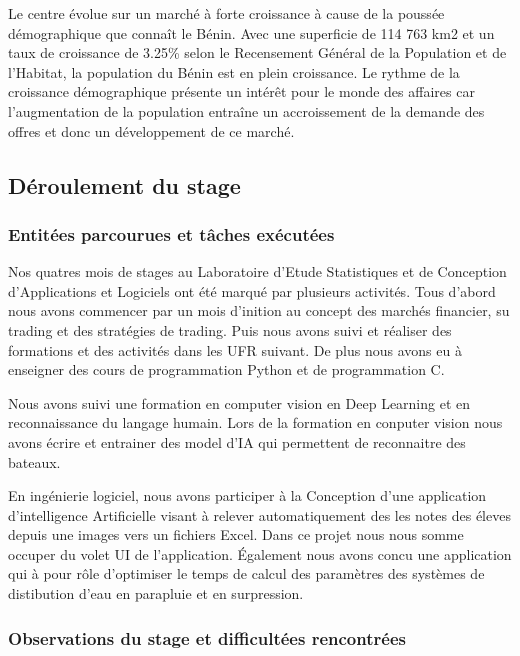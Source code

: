 Le centre évolue sur un marché à forte croissance à cause de la poussée
démographique que connaît le Bénin. Avec une superficie de 114 763 km2
et un taux de croissance de 3.25\% selon le Recensement Général de la
Population et de l'Habitat, la population du Bénin est en plein
croissance. Le rythme de la croissance démographique présente un intérêt
pour le monde des affaires car l'augmentation de la population entraîne
un accroissement de la demande des offres et donc un développement de ce
marché.

\subsection{Déroulement du stage}\label{duxe9roulement-du-stage}

\subsubsection{Entitées parcourues et tâches
exécutées}\label{entituxe9es-parcourues-et-tuxe2ches-exuxe9cutuxe9es}

{Nos quatres mois de stages au Laboratoire d'Etude Statistiques et de
Conception d'Applications et Logiciels ont été marqué par plusieurs
activités. Tous d'abord nous avons commencer par un mois d'inition au
concept des marchés financier, su trading et des stratégies de trading.
Puis nous avons suivi et réaliser des formations et des activités dans
les UFR suivant. De plus nous avons eu à enseigner des cours de
programmation Python et de programmation C. }

{Nous avons suivi une formation en computer vision en Deep Learning et
en reconnaissance du langage humain. Lors de la formation en conputer
vision nous avons écrire et entrainer des model d'IA qui permettent de
reconnaitre des bateaux.}

{En ingénierie logiciel, nous avons participer à la Conception d'une
application d'intelligence Artificielle visant à relever automatiquement
des les notes des éleves depuis une images vers un fichiers Excel. Dans
ce projet nous nous somme occuper du volet UI de l'application.
Également nous avons concu une application qui à pour rôle d'optimiser
le temps de calcul des paramètres des systèmes de distibution d'eau en
parapluie et en surpression.}

\subsubsection{Observations du stage et difficultées
rencontrées}\label{observations-du-stage-et-difficultuxe9es-rencontruxe9es}

